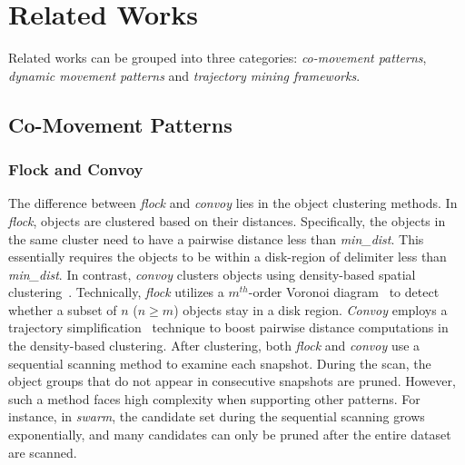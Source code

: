 \section{Related Works}
\label{sec:related_works}
Related works can be grouped into three categories: \emph{co-movement patterns},
\emph{dynamic movement patterns} and \emph{trajectory mining frameworks}.

\subsection{Co-Movement Patterns}
\vspace{-2mm}
\subsubsection{Flock and Convoy}
The difference between \emph{flock} and \emph{convoy} lies 
in the object clustering methods. In \emph{flock},
objects are clustered based on their distances. Specifically, the
objects in the same cluster need to have a pairwise distance less than \emph{min\_dist}. 
This essentially requires the objects to be within a disk-region of delimiter less than \emph{min\_dist}.
In contrast, \emph{convoy} clusters objects using density-based spatial clustering~\cite{ester1996density}.
Technically, \emph{flock} utilizes a $m^{th}$-order Voronoi diagram~\cite{laube2005finding} to detect whether
a subset of $n$ ($n \geq m$) objects stay in a disk region.
\emph{Convoy} employs
a trajectory simplification~\cite{douglas1973linesimplification} technique to boost pairwise distance computations in
the density-based clustering.
After clustering, both \emph{flock} and \emph{convoy} use a sequential scanning
method to examine each snapshot. 
During the scan, the object groups that do 
not appear in consecutive snapshots are pruned.
However, such a method faces high complexity when supporting other patterns.
For instance, in \emph{swarm}, the candidate set during the sequential scanning grows
exponentially, and many candidates can only be pruned after the entire dataset are scanned.

